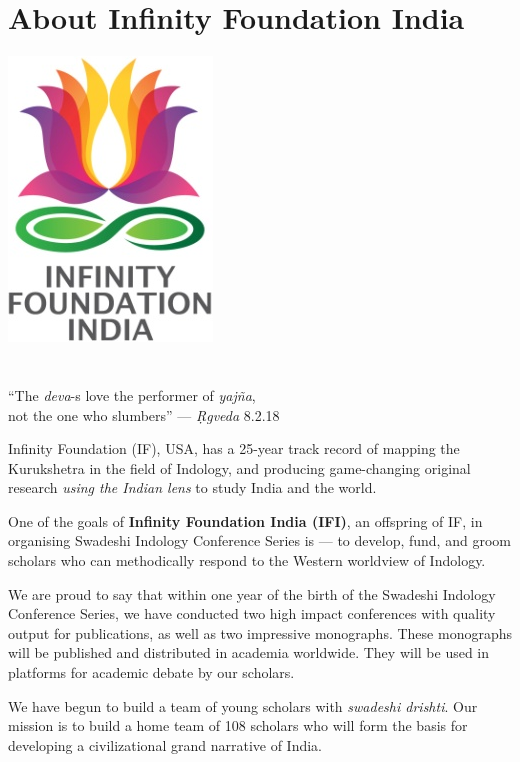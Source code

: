
\chapter*{About Infinity Foundation India}

\begin{center}
 \includegraphics[scale=0.23]{images/logo.png}\\\\\\
 “The \textit{deva}-s love the performer of \textit{yajña},\\ 
 not the one who slumbers” — \textit{Ṛgveda} 8.2.18
\end{center}

Infinity Foundation (IF), USA, has a 25-year track record of mapping the Kurukshetra in the field of Indology, and producing game-changing original research \textit{using the Indian lens} to study India and the world.

One of the goals of \textbf{Infinity Foundation India (IFI)}, an offspring of IF, in organising Swadeshi Indology Conference Series is — to develop, fund, and groom scholars who can methodically respond to the Western worldview of Indology.

We are proud to say that within one year of the birth of the Swadeshi Indology Conference Series, we have conducted two high impact conferences with quality output for publications, as well as two impressive monographs. These monographs will be published and distributed in academia worldwide. They will be used in platforms for academic debate by our scholars.

We have begun to build a team of young scholars with \textit{swadeshi drishti}. Our mission is to build a home team of 108 scholars who will form the basis for developing a civilizational grand narrative of India.

